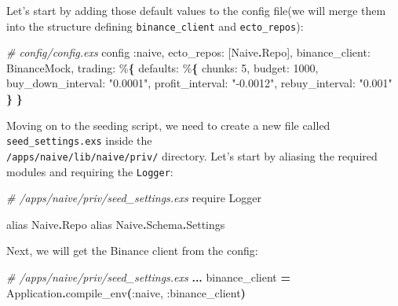 \documentclass[
  oneside]{book}
\newenvironment{Shaded}{\begin{snugshade}}{\end{snugshade}}
\newcommand{\CommentTok}[1]{\textcolor[rgb]{0.56,0.35,0.01}{\textit{#1}}}
\newcommand{\ConstantTok}[1]{\textcolor[rgb]{0.56,0.35,0.01}{#1}}
\newcommand{\DecValTok}[1]{\textcolor[rgb]{0.00,0.00,0.81}{#1}}
\newcommand{\FunctionTok}[1]{\textcolor[rgb]{0.13,0.29,0.53}{\textbf{#1}}}
\newcommand{\ImportTok}[1]{#1}
\newcommand{\NormalTok}[1]{#1}
\newcommand{\OperatorTok}[1]{\textcolor[rgb]{0.81,0.36,0.00}{\textbf{#1}}}
\newcommand{\OtherTok}[1]{\textcolor[rgb]{0.56,0.35,0.01}{#1}}
\newcommand{\StringTok}[1]{\textcolor[rgb]{0.31,0.60,0.02}{#1}}
\newcommand{\VariableTok}[1]{\textcolor[rgb]{0.00,0.00,0.00}{#1}}
\begin{document}
Let's start by adding those default values to the config file(we will merge them into the structure defining \texttt{binance\_client} and \texttt{ecto\_repos}):

\begin{Shaded}
\begin{Highlighting}[]
\CommentTok{\# config/config.exs}
\NormalTok{config }\VariableTok{:naive}\NormalTok{,}
  \VariableTok{ecto\_repos:} \OtherTok{[}\ConstantTok{Naive}\OperatorTok{.}\ConstantTok{Repo}\OtherTok{]}\NormalTok{,}
  \VariableTok{binance\_client:} \ConstantTok{BinanceMock}\NormalTok{,}
  \VariableTok{trading:}\NormalTok{ \%}\FunctionTok{\{}
    \VariableTok{defaults:}\NormalTok{ \%}\FunctionTok{\{}
      \VariableTok{chunks:} \DecValTok{5}\NormalTok{,}
      \VariableTok{budget:} \DecValTok{1000}\NormalTok{,}
      \VariableTok{buy\_down\_interval:} \StringTok{"0.0001"}\NormalTok{,}
      \VariableTok{profit\_interval:} \StringTok{"{-}0.0012"}\NormalTok{,}
      \VariableTok{rebuy\_interval:} \StringTok{"0.001"}
    \FunctionTok{\}}
  \FunctionTok{\}}
\end{Highlighting}
\end{Shaded}

\newpage

Moving on to the seeding script, we need to create a new file called \texttt{seed\_settings.exs} inside the\\
\texttt{/apps/naive/lib/naive/priv/} directory. Let's start by aliasing the required modules and requiring the \texttt{Logger}:

\begin{Shaded}
\begin{Highlighting}[]
\CommentTok{\# /apps/naive/priv/seed\_settings.exs}
\ImportTok{require} \ConstantTok{Logger}

\ImportTok{alias} \ConstantTok{Naive}\OperatorTok{.}\ConstantTok{Repo}
\ImportTok{alias} \ConstantTok{Naive}\OperatorTok{.}\ConstantTok{Schema}\OperatorTok{.}\ConstantTok{Settings}
\end{Highlighting}
\end{Shaded}

Next, we will get the Binance client from the config:

\begin{Shaded}
\begin{Highlighting}[]
\CommentTok{\# /apps/naive/priv/seed\_settings.exs}
\OperatorTok{...}
\NormalTok{binance\_client }\OperatorTok{=} \ConstantTok{Application}\OperatorTok{.}\NormalTok{compile\_env}\FunctionTok{(}\VariableTok{:naive}\NormalTok{, }\VariableTok{:binance\_client}\FunctionTok{)}
\end{Highlighting}
\end{Shaded}
\end{document}
